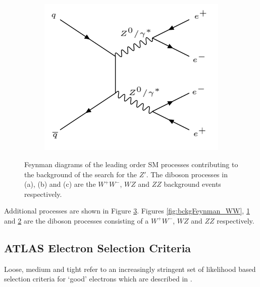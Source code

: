 \documentclass{article}
\begin{document}
\begin{figure}[htb]
\begin{subfigure}{.25\textwidth}
        \caption{}
        \label{fig:bckgFeynman_WZ}
    \end{subfigure}
    \begin{subfigure}{.25\textwidth}
        \includegraphics[height=\textwidth]{images/ZZ.png}
        \caption{}
        \label{fig:bckgFeynman_ZZ}
    \end{subfigure}
    \caption{Feynman diagrams of the leading order SM processes contributing to the background of the search for the $Z'$. The diboson processes in (a), (b) and (c) are the $W^+W^-$, $WZ$ and $ZZ$ background events respectively.\label{fig:bckgFeynman2}}
\end{figure}

Additional processes are shown in Figure \ref{fig:bckgFeynman2}. Figures \ref{fig:bckgFeynman_WW}, \ref{fig:bckgFeynman_WZ} and \ref{fig:bckgFeynman_ZZ} are the diboson processes consisting of a $W^+W^-$, $WZ$ and $ZZ$ respectively.


\subsection{ATLAS Electron Selection Criteria}
\label{sec:cuts_selection}
Loose, medium and tight refer to an increasingly stringent set of likelihood based selection criteria for `good' electrons which are described in \cite{expectedElectronPerformance}.
\end{document}
